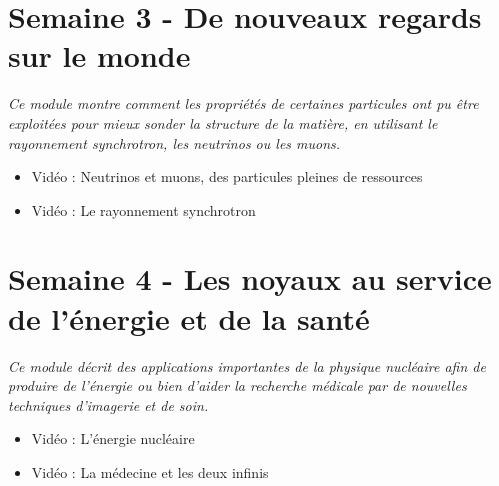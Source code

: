 \section*{Semaine 3 - De nouveaux regards sur le monde}

\textit{Ce module montre comment les propriétés de certaines particules ont pu être exploitées pour mieux sonder la structure de la matière, en utilisant le rayonnement synchrotron, les neutrinos ou les muons.}
    
    
\begin{itemize}[label={$\bullet$}]
    \item Vidéo : Neutrinos et muons, des particules pleines de ressources
    \item Vidéo : Le rayonnement synchrotron
\end{itemize}    

\section*{Semaine 4 - Les noyaux au service de l'énergie et de la santé}

\textit{Ce module décrit des applications importantes de la physique nucléaire afin de produire de l'énergie ou bien d'aider la recherche médicale par de nouvelles techniques d'imagerie et de soin.}
      
      
\begin{itemize}[label={$\bullet$}]
    \item Vidéo : L'énergie nucléaire
    \item Vidéo : La médecine et les deux infinis
\end{itemize}

